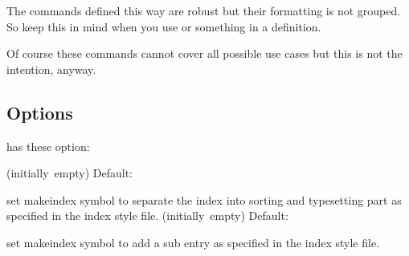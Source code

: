 \documentclass{cnpkgdoc}
\newcommand*\Default[1]{%
  \hfill\llap
    {%
      \ifblank{#1}%
        {(initially~empty)}%
        {Default:~\code{#1}}%
    }%
  \newline
}
\begin{document}
The commands defined this way are robust but their formatting is not grouped. So
keep this in mind when you use  or something in a definition.

Of course these commands cannot cover all possible use cases but this is not the
intention, anyway.

\subsection{Options}
\idxcmds has these option:
\begin{beschreibung}
 \Default{@}
   set makeindex symbol to separate the index into sorting and typesetting part
   as specified in the index style file.
 \Default{!}
   set makeindex symbol to add a sub entry as specified in the index style file.
\end{beschreibung}


\begingroup
\printindex
\def\clearpage{\vskip\baselineskip}
\printindex[examples]
\endgroup
\end{document}
